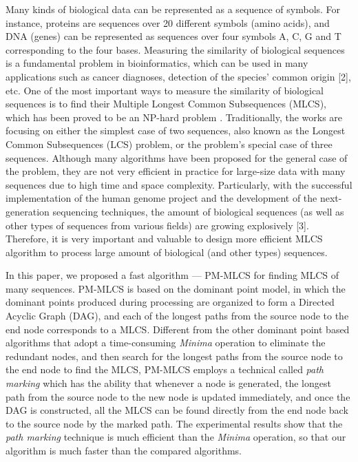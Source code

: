\documentclass{article}
\begin{document}
Many kinds of biological data can be represented as a sequence of
symbols. For instance, proteins are sequences over 20 different
symbols (amino acids), and DNA (genes) can be represented as sequences
over four symbols A, C, G and T corresponding to the four bases.
Measuring the similarity of biological sequences is a fundamental
problem in bioinformatics, which can be used in many applications such
as cancer diagnoses, detection of the species’ common origin [2],
etc. One of the most important ways to measure the similarity of
biological sequences is to find their Multiple Longest Common
Subsequences (MLCS), which has been proved to be an NP-hard problem
\cite{Maier1978}. Traditionally, the works are focusing on either the
simplest case of two sequences, also known as the Longest Common
Subsequences (LCS) problem, or the problem’s special case of three
sequences. Although many algorithms have been proposed for the general
case of the problem, they are not very efficient in practice for
large-size data with many sequences due to high time and space
complexity. Particularly, with the successful implementation of the
human genome project and the development of the next-generation
sequencing techniques, the amount of biological sequences (as well as
other types of sequences from various fields) are growing explosively
[3]. Therefore, it is very important and valuable to design more
efficient MLCS algorithm to process large amount of biological (and
other types) sequences.

In this paper, we proposed a fast algorithm --- PM-MLCS for finding
MLCS of many sequences. PM-MLCS is based on the dominant point model,
in which the dominant points produced during processing are organized
to form a Directed Acyclic Graph (DAG), and each of the longest paths
from the source node to the end node corresponds to a MLCS. Different
from the other dominant point based algorithms that adopt a
time-consuming \emph{Minima} operation to eliminate the redundant
nodes, and then search for the longest paths from the source node to
the end node to find the MLCS, PM-MLCS employs a technical called
\emph{path marking} which has the ability that whenever a node is
generated, the longest path from the source node to the new node is
updated immediately, and once the DAG is constructed, all the MLCS can
be found directly from the end node back to the source node by the
marked path. The experimental results show that the \emph{path
  marking} technique is much efficient than the \emph{Minima}
operation, so that our algorithm is much faster than the compared
algorithms.
\end{document}
